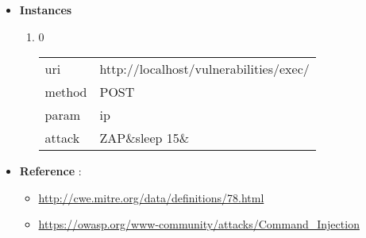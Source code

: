 \documentclass[10pt]{article}
\begin{document}
\begin{itemize}
\item[] \textbf{Instances}
\begin{enumerate}
\item[] 0
\begin{tabular}{| l | p{12cm}}
uri & http://localhost/vulnerabilities/exec/ \\
method & POST \\
param & ip \\
attack & ZAP\&sleep 15\& \\
\end{tabular}
\end{enumerate}
\item[] \textbf{Reference} : 
\begin{itemize}
\item \url{http://cwe.mitre.org/data/definitions/78.html}
\item \url{https://owasp.org/www-community/attacks/Command\_Injection}
\end{itemize}
\end{itemize}
\end{document}
